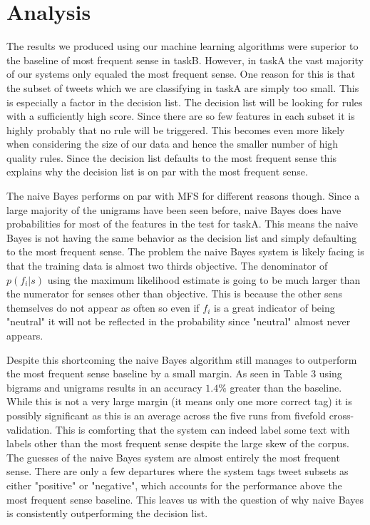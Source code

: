 \documentclass[11pt]{article}
\begin{document}
\section{Analysis}
\indent The results we produced using our machine learning algorithms were superior to the baseline of most frequent sense in taskB. However, in taskA the vast majority of our systems only equaled the most frequent sense. One reason for this is that the subset of tweets which we are classifying in taskA are simply too small. This is especially a factor in the decision list. The decision list will be looking for rules with a sufficiently high score. Since there are so few features in each subset it is highly probably that no rule will be triggered. This becomes even more likely when considering the size of our data and hence the smaller number of high quality rules. Since the decision list defaults to the most frequent sense this explains why the decision list is on par with the most frequent sense.

The naive Bayes performs on par with MFS for different reasons though. Since a large majority of the unigrams have been seen before, naive Bayes does have probabilities for most of the features in the test for taskA. This means the naive Bayes is not having the same behavior as the decision list and simply defaulting to the most frequent sense. The problem the naive Bayes system is likely facing is that the training data is almost two thirds objective. The denominator of $p(f_i |  s)$ using the maximum likelihood estimate is going to be much larger than the numerator for senses other than objective. This is because the other sens themselves do not appear as often so even if $f_i$ is a great indicator of being "neutral" it will not be reflected in the probability since "neutral" almost never appears.

Despite this shortcoming the naive Bayes algorithm still manages to outperform the most frequent sense baseline by a small margin. As seen in Table 3 using bigrams and unigrams results in an accuracy $1.4\%$ greater than the baseline. While this is not a very large margin (it means only one more correct tag) it is possibly significant as this is an average across the five runs from fivefold cross-validation. This is comforting that the system can indeed label some text with labels other than the most frequent sense despite the large skew of the corpus. The guesses of the naive Bayes system are almost entirely the most frequent sense. There are only a few departures where the system tags tweet subsets as either "positive" or "negative", which accounts for the performance above the most frequent sense baseline. This leaves us with the question of why naive Bayes is consistently outperforming the decision list.
\end{document}
